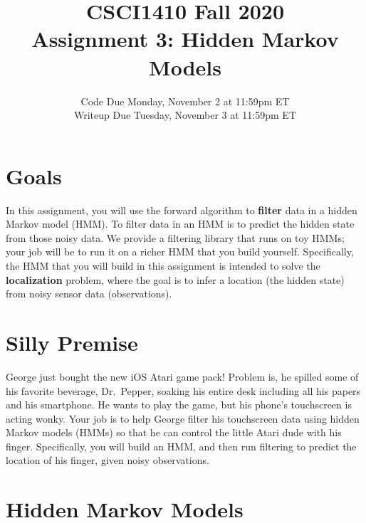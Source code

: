 \documentclass{article}
\title{CSCI1410 Fall 2020 \\
Assignment 3: Hidden Markov Models}
\date{Code Due Monday, November 2 at 11:59pm ET \\ [1ex]
Writeup Due Tuesday, November 3 at 11:59pm ET}
\begin{document}
\maketitle


\section{Goals}

In this assignment, you will use the forward algorithm to
\textbf{filter} data in a hidden Markov model (HMM).  To filter data
in an HMM is to predict the hidden state from those noisy data.  We
provide a filtering library that runs on toy HMMs; your job will be to
run it on a richer HMM that you build yourself.  Specifically, the HMM
that you will build in this assignment is intended to solve the
\textbf{localization} problem, where the goal is to infer a location
(the hidden state) from noisy sensor data (observations).


\section{Silly Premise}

George just bought the new iOS Atari game pack! Problem is, he spilled
some of his favorite beverage, Dr.\ Pepper, soaking his entire desk
including all his papers and his smartphone.  He wants to play the
game, but his phone's touchscreen is acting wonky.  Your job is to
help George filter his touchscreen data using hidden Markov models
(HMMs) so that he can control the little Atari dude with his finger.
Specifically, you will build an HMM, and then run filtering to
predict the location of his finger, given noisy observations.


\section{Hidden Markov Models}
\end{document}
